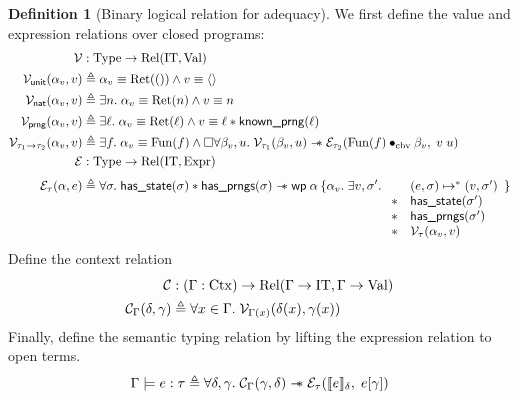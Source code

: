 \documentclass{article}
\theoremstyle{definition}
\newtheorem{definition}{Definition}[section]
\theoremstyle{plain}
\theoremstyle{remark}
\newcommand{\redu}{\mapsto}
\newcommand{\hasstate}{\textsf{has\_state}}
\newcommand{\IT}{\mathrm{IT}}
\newcommand{\gRet}{\mathrm{Ret}}
\newcommand{\gFun}{\mathrm{Fun}}
\newcommand{\cbvap}{\bullet_{\text{cbv}}}
\newcommand{\knownprng}{\textsf{known\_prng}}
\newcommand{\hasprngs}{\textsf{has\_prngs}}
\begin{document}
\begin{definition}[Binary logical relation for adequacy]
  We first define the value and expression relations over closed programs:
  \begin{align*}
    \mathcal{V} & : \iType \to \mathrm{Rel}(\IT,\iVal) \\
    \mathcal{V}_{\tunit}(\alpha_v,v) &\eqdef \alpha_v \equiv \gRet(()) \land v \equiv \vunit \\
    \mathcal{V}_{\tnat}(\alpha_v,v)  &\eqdef \exists n.\; \alpha_v \equiv \gRet(n) \land v \equiv n \\
    \mathcal{V}_{\syn{prng}}(\alpha_v,v) &\eqdef \exists \loc.\;
    \alpha_v \equiv \gRet(\loc) \land v \equiv \loc \star \knownprng(\loc) \\
    \mathcal{V}_{\type_1 \to \type_2}(\alpha_v,v) &\eqdef \exists f.\;
    \alpha_v \equiv \gFun(f) \land
    \Box\forall \beta_v,u.\; \mathcal{V}_{\type_1}(\beta_v,u) \wand
    \mathcal{E}_{\type_2}(\gFun(f)\cbvap \beta_v,\; \eapp{v}{u})\\
    \mathcal{E} & : \iType \to \mathrm{Rel}(\IT,\iExpr) \\[0.6ex]
    \mathcal{E}_{\type}(\alpha,e) &\eqdef \forall \sigma.\;
    \hasstate(\sigma) \star \hasprngs(\sigma) \wand
    \wpre{\alpha}{\alpha_v.\; \exists v,\sigma'.\;
      \begin{array}[t]{ll}
        &(e,\sigma) \redu^\ast (v,\sigma')\\
        \star & \hasstate(\sigma')\\
        \star & \hasprngs(\sigma')\\
        \star & \mathcal{V}_{\type}(\alpha_v,v)
    \end{array}}
  \end{align*}
  Define the context relation
  \begin{align*}
    \mathcal{C} &: (\Gamma : \mathrm{Ctx}) \to \mathrm{Rel}(\Gamma\to \IT, \Gamma \to \iVal) \\
    \mathcal{C}_{\Gamma}(\senv,\env) &\eqdef \forall x\in\Gamma.\;
    \mathcal{V}_{\Gamma(x)}(\senv(x),\env(x))
  \end{align*}
  Finally, define the semantic typing relation by lifting the expression relation to open terms.
  \begin{align*}
    {\Gamma}\models{e}\mathrel{:}{\tau} \triangleq
    \forall \delta,\gamma.\;
    \mathcal{C}_{\Gamma}(\gamma,\delta) \mathrel{-\!\!*}
    \mathcal{E}_{\tau}(\llbracket {e} \rrbracket_\delta,\; e[\gamma])
  \end{align*}
\end{definition}
\end{document}
